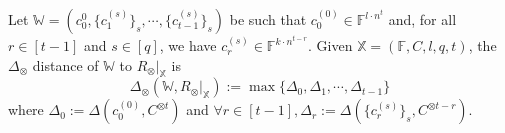 \begin{definition}
Let $\mathbb{W} = (c_0^{0}, \{c_1^{(s)}\}_s, \cdots, \{c_{t-1}^{(s)}\}_s)$ be such that $c_0^{(0)} \in \mathbb{F}^{l \cdot n^t}$ and, for all $r \in [t-1]$ and $s \in [q]$, we have $c_r^{(s)} \in \mathbb{F}^{k \cdot n^{t-r}}$. Given $\mathbb{X} = (\mathbb{F}, C, l, q, t)$, the $\Delta_\otimes$ distance of $\mathbb{W}$ to $R_\otimes|_{\mathbb{X}}$ is
$$
    \Delta_\otimes(\mathbb{W}, R_\otimes|_{\mathbb{X}}) := \max \{\Delta_0, \Delta_1, \cdots, \Delta_{t-1}\}
$$
where $\Delta_0 := \Delta(c_0^{(0)}, C^{\otimes t})$ and $\forall r \in [t-1], \Delta_r := \Delta(\{c_r^{(s)}\}_s, C^{\otimes t-r})$.
\end{definition}

